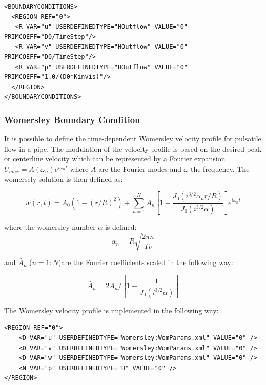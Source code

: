 \begin{lstlisting}[style=XMLStyle]
<BOUNDARYCONDITIONS>
  <REGION REF="0">
   <R VAR="u" USERDEFINEDTYPE="HOutflow" VALUE="0" PRIMCOEFF="D0/TimeStep"/>
   <R VAR="v" USERDEFINEDTYPE="HOutflow" VALUE="0" PRIMCOEFF="D0/TimeStep"/>
   <R VAR="p" USERDEFINEDTYPE="HOutflow" VALUE="0" PRIMCOEFF="1.0/(D0*Kinvis)"/>
  </REGION>
</BOUNDARYCONDITIONS>
\end{lstlisting}

\subsubsection{Womersley Boundary Condition}

It is possible to define the time-dependent Womersley velocity profile
for pulsatile flow in a pipe. The modulation of the velocity profile
is based on the desired peak or centerline velocity which can be
represented by a Fourier expansion $U_{max}=A(\omega_n)e^{i\omega_n
  t}$ where $A$ are the Fourier modes and $\omega $ the frequency. The
womersely solution is then defined as:

$$ w(r,t) = A_0(1-(r/R)^2) + \sum_{n=1}^N
\tilde{A_n}[1-\frac{J_0(i^{3/2}\alpha_n r/R)}{J_0(i^{3/2}
    \alpha)}]e^{i\omega_n t} $$

where the womersley number $\alpha$ is defined:
$$ \alpha_n = R\sqrt{\frac{2\pi n}{T\nu}}$$

and $\tilde{A_n}$ ($n=1:N$)are the Fourier coefficients scaled in the
following way:

$$ \tilde{A_n} = 2A_n/[1 - \frac{1}{J_0(i^{3/2}\alpha)}] $$

The Womersley velocity profile is implemented in the following way:

\begin{lstlisting}[style=XMLStyle]
<REGION REF="0">
    <D VAR="u" USERDEFINEDTYPE="Womersley:WomParams.xml" VALUE="0" />
    <D VAR="v" USERDEFINEDTYPE="Womersley:WomParams.xml" VALUE="0" />
    <D VAR="w" USERDEFINEDTYPE="Womersley:WomParams.xml" VALUE="0" />
    <N VAR="p" USERDEFINEDTYPE="H" VALUE="0" />
</REGION>
\end{lstlisting}

